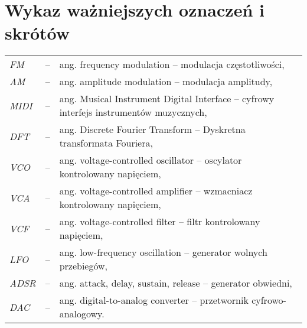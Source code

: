 \chapter*{Wykaz ważniejszych oznaczeń i skrótów}

\begin{tabular}{lcl}
	\textit{FM} & -- & ang. frequency modulation -- modulacja częstotliwości, \\
	\textit{AM} & -- & ang. amplitude modulation -- modulacja amplitudy, \\
	\textit{MIDI} & -- & ang. Musical Instrument Digital Interface -- cyfrowy interfejs instrumentów muzycznych, \\
	\textit{DFT} & -- & ang. Discrete Fourier Transform -- Dyskretna transformata Fouriera, \\
	\textit{VCO} & -- & ang. voltage-controlled oscillator -- oscylator kontrolowany napięciem, \\
	\textit{VCA} & -- & ang. voltage-controlled amplifier -- wzmacniacz kontrolowany napięciem, \\
	\textit{VCF} & -- & ang. voltage-controlled filter -- filtr kontrolowany napięciem, \\
	\textit{LFO} & -- & ang. low-frequency oscillation -- generator wolnych przebiegów, \\
	\textit{ADSR} & -- & ang. attack, delay, sustain, release -- generator obwiedni, \\
	\textit{DAC} & -- & ang. digital-to-analog converter -- przetwornik cyfrowo-analogowy. \\
\end{tabular} 
